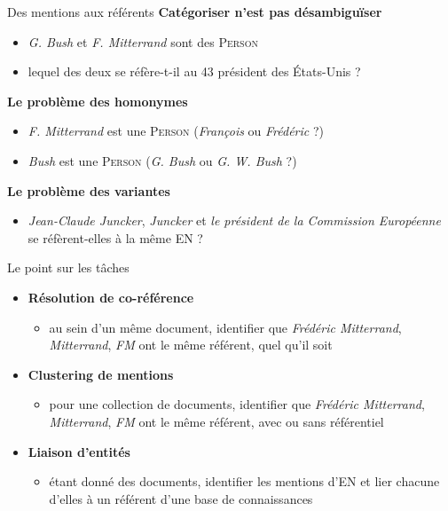 \documentclass[xetex,xcolor={table,usenames,dvipsnames}]{beamer}
\begin{document}
\begin{frame}{Des mentions aux référents}
	\textcolor{deepblue}{\textbf{Catégoriser n'est pas désambiguïser}}
	\begin{itemize}
		\item \textit{G. Bush} et \textit{F. Mitterrand} sont des \textsc{Person}
		\item lequel des deux se réfère-t-il au 43\ieme{} président des États-Unis ?
	\end{itemize}
	
	\textcolor{deepblue}{\textbf{Le problème des homonymes}}
	\begin{itemize}
		\item \textit{F. Mitterrand} est une \textsc{Person} (\textit{François} ou \textit{Frédéric} ?)
		\item \textit{Bush} est une \textsc{Person} (\textit{G. Bush} ou \textit{G. W. Bush} ?)
	\end{itemize}
	
	\textcolor{deepblue}{\textbf{Le problème des variantes}} 
	\begin{itemize}
		\item \textit{Jean-Claude Juncker}, \textit{Juncker} et \textit{le président de la Commission Européenne} se réfèrent-elles à la même \textsc{EN} ?
	\end{itemize}
\end{frame}

\begin{frame}{Le point sur les tâches}
	\begin{itemize}
		\item \textcolor{deepblue}{\textbf{Résolution de co-référence}}
		\begin{itemize}
			\item au sein d'un même document, identifier que \textit{Frédéric Mitterrand}, \textit{Mitterrand}, \textit{FM} ont le même référent, quel qu'il soit
		\end{itemize}
		\item \textcolor{deepblue}{\textbf{Clustering de mentions}}
		\begin{itemize}
			\item pour une collection de documents, identifier que \textit{Frédéric Mitterrand}, \textit{Mitterrand}, \textit{FM} ont le même référent, avec ou sans référentiel
		\end{itemize}
		\item \textcolor{deepblue}{\textbf{Liaison d'entités}}
		\begin{itemize}
			\item étant donné des documents, identifier les mentions d'\textsc{EN} et lier chacune d'elles à un référent d'une base de connaissances
		\end{itemize}
	\end{itemize}
\end{frame}
\end{document}
